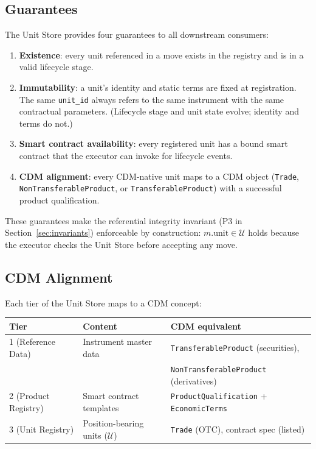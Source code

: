 \documentclass[11pt,a4paper]{article}
\begin{document}
\subsection{Guarantees}

The Unit Store provides four guarantees to all downstream consumers:

\begin{enumerate}
\item \textbf{Existence}: every unit referenced in a move exists in the registry and is in a valid lifecycle stage.
\item \textbf{Immutability}: a unit's identity and static terms are fixed at registration. The same \texttt{unit\_id} always refers to the same instrument with the same contractual parameters. (Lifecycle stage and unit state evolve; identity and terms do not.)
\item \textbf{Smart contract availability}: every registered unit has a bound smart contract that the executor can invoke for lifecycle events.
\item \textbf{CDM alignment}: every CDM-native unit maps to a CDM object (\texttt{Trade}, \texttt{NonTransferableProduct}, or \texttt{TransferableProduct}) with a successful product qualification.
\end{enumerate}

\noindent These guarantees make the referential integrity invariant (P3 in Section~\ref{sec:invariants}) enforceable by construction: $m.\text{unit} \in \mathcal{U}$ holds because the executor checks the Unit Store before accepting any move.

\subsection{CDM Alignment}

Each tier of the Unit Store maps to a CDM concept:

\begin{center}
\small
\begin{tabular}{l l l}
\toprule
\textbf{Tier} & \textbf{Content} & \textbf{CDM equivalent} \\
\midrule
1 (Reference Data) & Instrument master data & \texttt{TransferableProduct} (securities), \\
 & & \texttt{NonTransferableProduct} (derivatives) \\
2 (Product Registry) & Smart contract templates & \texttt{ProductQualification} + \texttt{EconomicTerms} \\
3 (Unit Registry) & Position-bearing units ($\mathcal{U}$) & \texttt{Trade} (OTC), contract spec (listed) \\
\bottomrule
\end{tabular}
\end{center}
\end{document}
